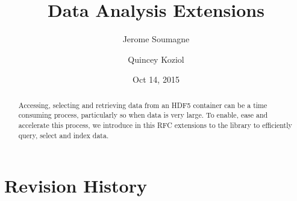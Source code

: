 \documentclass[letterpaper,hyper]{THG_RFC}
\title{Data Analysis Extensions}
\author{Jerome Soumagne}
\author{Quincey Koziol}
\date{Oct 14, 2015}
\begin{document}
\maketitle

\begin{abstract}
Accessing, selecting and retrieving data from an HDF5 container can be a time
consuming process, particularly so when data is very large. To enable, ease and 
accelerate this process, we introduce in this RFC extensions to the library
to efficiently query, select and index data.
\end{abstract}



\section*{Revision History}
\makerevisions



\end{document}
